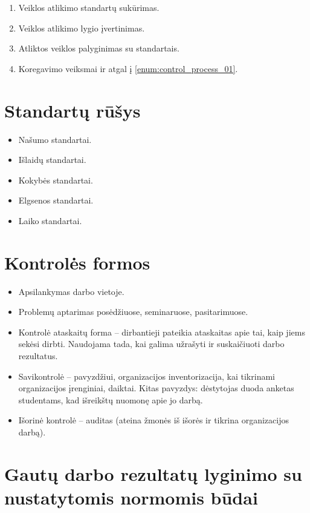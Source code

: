 \begin{enumerate}
  \item \label{enum:control_process_01} Veiklos atlikimo standartų
    sukūrimas.
  \item Veiklos atlikimo lygio įvertinimas.
  \item Atliktos veiklos palyginimas su standartais.
  \item Koregavimo veiksmai ir atgal į \ref{enum:control_process_01}.
\end{enumerate}

\section{Standartų rūšys}

\begin{itemize}
  \item Našumo standartai.
  \item Išlaidų standartai.
  \item Kokybės standartai.
  \item Elgsenos standartai.
  \item Laiko standartai.
\end{itemize}

\section{Kontrolės formos}

\begin{itemize}
  \item Apsilankymas darbo vietoje.
  \item Problemų aptarimas posėdžiuose, seminaruose, pasitarimuose.
  \item Kontrolė ataskaitų forma – dirbantieji pateikia ataskaitas
    apie tai, kaip jiems sekėsi dirbti. Naudojama tada, kai galima
    užrašyti ir suskaičiuoti darbo rezultatus.
  \item Savikontrolė – pavyzdžiui, organizacijos inventorizacija, kai
    tikrinami organizacijos įrenginiai, daiktai. Kitas pavyzdys:
    dėstytojas duoda anketas studentams, kad išreikštų nuomonę apie
    jo darbą.
  \item Išorinė kontrolė – auditas (ateina žmonės iš išorės ir tikrina
    organizacijos darbą).
\end{itemize}

\section{Gautų darbo rezultatų lyginimo su nustatytomis normomis būdai}

